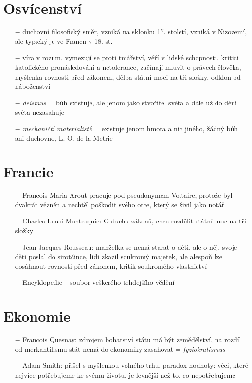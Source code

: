 \documentclass{article}
\begin{document}
\section*{Osvícenství}
\begin{itemize}
    \vspace{-0.5em}
    \setlength\itemsep{0.15em}
    \item[$-$] duchovní filosofický směr, vzniká na sklonku 17. století, vzniká v Nizozemí, ale typický je ve Francii v 18. st.
    \item[$-$] víra v rozum, vymezují se proti tmářství, věří v lidské schopnosti, kritici katolického pronásledování a netolerance, začínají mluvit o právech člověka, myšlenka rovnosti před zákonem, dělba státní moci na tři složky, odklon od náboženství
    \item[$-$] \textit{deismus} = bůh existuje, ale jenom jako stvořitel světa a dále už do dění světa nezasahuje
    \item[$-$] \textit{mechaničtí materialisté} = existuje jenom hmota a \underline{nic} jiného, žádný bůh ani duchovno, L. O. de la Metrie


\end{itemize}

\section*{Francie}
\begin{itemize}
    \vspace{-0.5em}
    \setlength\itemsep{0.15em}
    \item[$-$] Francois Maria Arout pracuje pod pseudonymem Voltaire, protože byl dvakrát vězněn a nechtěl poškodit svého otce, který se živil jako notář
    \item[$-$] Charles Lousi Montesquie: O duchu zákonů, chce rozdělit státní moc na tři složky
    \item[$-$] Jean Jacques Rousseau: manželka se nemá starat o děti, ale o něj, svoje děti poslal do sirotčince, lidi zkazil soukromý majetek, ale alespoň lze dosáhnout rovnosti před zákonem, kritik soukromého vlastnictví
    \item[$-$] Encyklopedie -- soubor veškerého tehdejšího vědění
\end{itemize}
\section*{Ekonomie}
\begin{itemize}
    \vspace{-0.5em}
    \setlength\itemsep{0.15em}
    \item[$-$] Francois Quesnay: zdrojem bohatství státu má být zemědělství, na rozdíl od merkantilismu stát nemá do ekonomiky zasahovat = \textit{fyziokratismus}
    \item[$-$] Adam Smith: přišel s myšlenkou volného trhu, paradox hodnoty: věci, které nejvíce potřebujeme ke svému životu, je levnější než to, co nepotřebujeme
\end{itemize}
\end{document}
